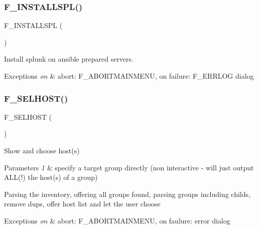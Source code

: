 \subsubsection{\texorpdfstring{F\+\_\+\+I\+N\+S\+T\+A\+L\+L\+S\+P\+L()}{F\_INSTALLSPL()}}
{\footnotesize\ttfamily F\+\_\+\+I\+N\+S\+T\+A\+L\+L\+S\+PL (\begin{DoxyParamCaption}{ }\end{DoxyParamCaption})}



Install splunk on ansible prepared servers. 


\begin{DoxyExceptions}{Exceptions}
{\em on} & abort\+: F\+\_\+\+A\+B\+O\+R\+T\+M\+A\+I\+N\+M\+E\+NU, on failure\+: F\+\_\+\+E\+R\+R\+L\+OG dialog \\
\hline
\end{DoxyExceptions}
\mbox{\label{ansible__engine_8sh_a8012bbe8c3a9244ff76f4000e67f191a}} 
\subsubsection{\texorpdfstring{F\+\_\+\+S\+E\+L\+H\+O\+S\+T()}{F\_SELHOST()}}
{\footnotesize\ttfamily F\+\_\+\+S\+E\+L\+H\+O\+ST (\begin{DoxyParamCaption}\item[{1}]{ }\end{DoxyParamCaption})}



Show and choose host(s) 


\begin{DoxyParams}{Parameters}
{\em 1} & specify a target group directly (non interactive -\/ will just output A\+LL(!) the host(s) of a group)\\
\hline
\end{DoxyParams}
Parsing the inventory, offering all groups found, parsing groups including childs, remove dups, offer host list and let the user choose 
\begin{DoxyExceptions}{Exceptions}
{\em on} & abort\+: F\+\_\+\+A\+B\+O\+R\+T\+M\+A\+I\+N\+M\+E\+NU, on faulure\+: error dialog \\
\hline
\end{DoxyExceptions}
\mbox{\label{ansible__engine_8sh_a11be079619b38fc891171796f6434bcb}} 
